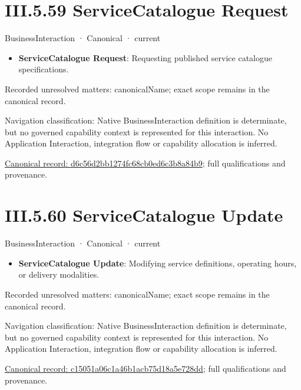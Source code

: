 \section*{III.5.59 ServiceCatalogue Request}
\label{navigation:III.5.59}

\label{element:d6c56d2bb1274fc68cb0ed6c3b8a84b9}
{\small BusinessInteraction · Canonical · current}\par

\begin{itemize}


\item \textbf{ServiceCatalogue Request}: Requesting published service catalogue specifications.

\end{itemize}

{\small Recorded unresolved matters: canonicalName; exact scope remains in the canonical record.}\par
{\small Navigation classification: Native BusinessInteraction definition is determinate, but no governed capability context is represented for this interaction. No Application Interaction, integration flow or capability allocation is inferred.}\par
{\footnotesize \href{../../../../continuum/business/business-interaction/d6c56d2bb1274fc68cb0ed6c3b8a84b9.md}{Canonical record: d6c56d2bb1274fc68cb0ed6c3b8a84b9}; full qualifications and provenance.}\par
\section*{III.5.60 ServiceCatalogue Update}
\label{navigation:III.5.60}

\label{element:c15051a06c1a46b1acb75d18a5e728dd}
{\small BusinessInteraction · Canonical · current}\par

\begin{itemize}


\item \textbf{ServiceCatalogue Update}: Modifying service definitions, operating hours, or delivery modalities.

\end{itemize}

{\small Recorded unresolved matters: canonicalName; exact scope remains in the canonical record.}\par
{\small Navigation classification: Native BusinessInteraction definition is determinate, but no governed capability context is represented for this interaction. No Application Interaction, integration flow or capability allocation is inferred.}\par
{\footnotesize \href{../../../../continuum/business/business-interaction/c15051a06c1a46b1acb75d18a5e728dd.md}{Canonical record: c15051a06c1a46b1acb75d18a5e728dd}; full qualifications and provenance.}\par
